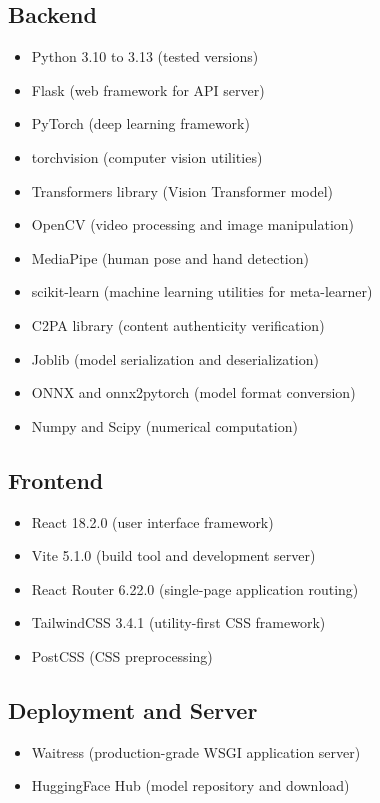 \documentclass[12pt,a4paper]{book}
\begin{document}
\subsection{Backend}
\begin{itemize}
    \item Python 3.10 to 3.13 (tested versions)
    \item Flask (web framework for API server)
    \item PyTorch (deep learning framework)
    \item torchvision (computer vision utilities)
    \item Transformers library (Vision Transformer model)
    \item OpenCV (video processing and image manipulation)
    \item MediaPipe (human pose and hand detection)
    \item scikit-learn (machine learning utilities for meta-learner)
    \item C2PA library (content authenticity verification)
    \item Joblib (model serialization and deserialization)
    \item ONNX and onnx2pytorch (model format conversion)
    \item Numpy and Scipy (numerical computation)
\end{itemize}

\subsection{Frontend}
\begin{itemize}
    \item React 18.2.0 (user interface framework)
    \item Vite 5.1.0 (build tool and development server)
    \item React Router 6.22.0 (single-page application routing)
    \item TailwindCSS 3.4.1 (utility-first CSS framework)
    \item PostCSS (CSS preprocessing)
\end{itemize}

\subsection{Deployment and Server}
\begin{itemize}
    \item Waitress (production-grade WSGI application server)
    \item HuggingFace Hub (model repository and download)
\end{itemize}
\end{document}
